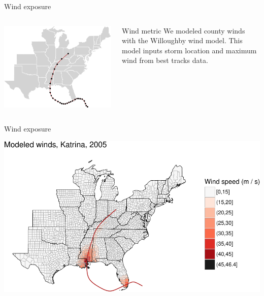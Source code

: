 \documentclass[ignorenonframetext,]{beamer}
\begin{document}
\begin{frame}{Wind exposure}

\begin{columns}
\begin{column}{0.7\textwidth}

\includegraphics[width=\textwidth]{anderson_jan11_files/figure-beamer/unnamed-chunk-6-1} 
\end{column}
\begin{column}{0.3\textwidth}
\small
\begin{block}{Wind metric}
We modeled county winds with the Willoughby wind model. This model inputs storm location and maximum wind from best tracks data. 
\end{block}
\end{column}
\end{columns}

\end{frame}

\begin{frame}{Wind exposure}

\begin{center}\includegraphics[width=\textwidth]{anderson_jan11_files/figure-beamer/unnamed-chunk-7-1} \end{center}

\end{frame}
\end{document}
